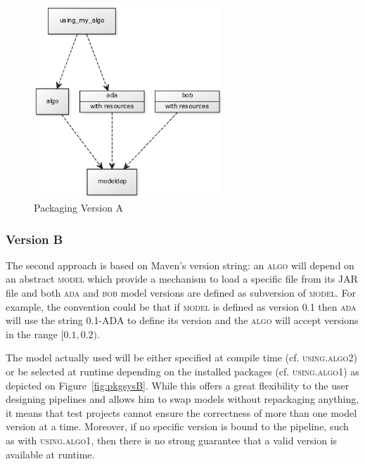 \documentclass{article}
\newcommand{\ID}[1]{{\textsc{#1}}}
\newcommand{\JAR}{JAR\xspace}
\begin{document}
\begin{appendices}
\begin{figure}
\centering
\includegraphics[width=200pt]{res/packaging_version_A.png}
\caption{Packaging Version A}
\label{fig:pkgsysA}
\end{figure}


\subsubsection{Version B}

The second approach is based on Maven's version string: an \ID{algo} will depend on an abstract
\ID{model} which provide a mechanism to load a specific file from its \JAR file and both \ID{ada}
and \ID{bob} model versions are defined as subversion of \ID{model}. For example, the convention
could be that if \ID{model} is defined as version \ID{0.1} then \ID{ada} will use the string
\ID{0.1-ADA} to define its version and the \ID{algo} will accept versions in the range $ [0.1,0.2)
$.

The model actually used will be either specified at compile time (cf. \ID{using.algo2}) or be selected at runtime depending on the installed packages (cf. \ID{using.algo1}) as depicted on Figure~\ref{fig:pkgsysB}. While this offers a great flexibility to the user designing pipelines and allows him to swap models without repackaging anything, it means that test projects cannot ensure the correctness of more than one model version at a time. Moreover, if no specific version is bound to the pipeline, such as with \ID{using.algo1}, then there is no strong guarantee that a valid version is available at runtime.


\end{appendices}
\end{document}
